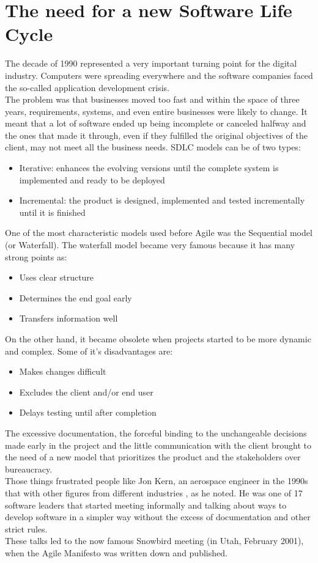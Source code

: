 \section{The need for a new Software Life Cycle}
	The decade of 1990 represented a very important turning point for the digital industry.
	Computers were spreading everywhere and the software companies faced the so-called application development crisis.\\
	The problem was that businesses moved too fast and within the space of three years, requirements, systems, and even entire businesses were likely to change. 
	It meant that a lot of software ended up being incomplete or canceled halfway and the ones that made it through, even if they fulfilled the original objectives of the client, may not meet all the business needs\cite{agility-beyond-history}.
	SDLC models can be of two types:
	\begin{itemize}
		\item Iterative: enhances the evolving versions until the complete system is implemented and ready to be deployed
		\item Incremental: the product is designed, implemented and tested incrementally until it is finished
	\end{itemize}
	One of the most characteristic models used before Agile was the Sequential model (or Waterfall).
	The waterfall model became very famous because it has many strong points as:
	\begin{itemize}
		\item Uses clear structure
		\item Determines the end goal early
		\item Transfers information well
	\end{itemize}
	On the other hand, it became obsolete when projects started to be more dynamic and complex.
	Some of it's disadvantages are:
	\begin{itemize}
		\item Makes changes difficult
		\item Excludes the client and/or end user
		\item Delays testing until after completion
	\end{itemize}
	The excessive documentation, the forceful binding to the unchangeable decisions made early in the project and the little communication with the client brought to the need of a new model that prioritizes the product and the stakeholders over bureaucracy.\\
	Those things frustrated people like Jon Kern, an aerospace engineer in the 1990s that with other figures from different industries , as he noted.
	He was one of 17 software leaders that started meeting informally and talking about ways to develop software in a simpler way without the excess of documentation and other strict rules.\\
	These talks led to the now famous Snowbird meeting (in Utah, February 2001), when the Agile Manifesto was written down and published.

